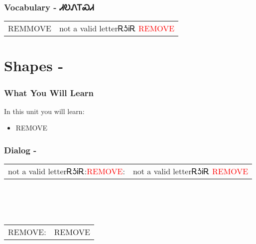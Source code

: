 \subsection{Vocabulary - ᏗᎧᏁᎢᏍᏗ 
}
\begin{tabular}{p{3cm} p{11cm}}
REMMOVE & not a valid letterᎡᎼᎥᎡ 
 \newline \textcolor{red}{REMOVE}\\
\end{tabular}

\index{}
\chapter{Shapes - }
\subsection{What You Will Learn}
In this unit you will learn:
\begin{itemize}
\item REMOVE
\end{itemize}\newpage

\subsection{Dialog - }
\begin{tabular}{p{2cm} p{11cm}}
not a valid letterᎡᎼᎥᎡ:\newline \textcolor{red}{REMOVE}: & not a valid letterᎡᎼᎥᎡ 
\newline\textcolor{red}{REMOVE}\\
\end{tabular}
\\
\\
\\
\noindent\begin{tabular}{p{2cm} p{11cm}}REMOVE: & REMOVE\\
\end{tabular}
